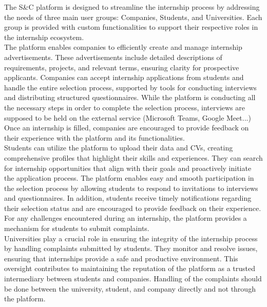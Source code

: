

The S\&C platform is designed to streamline the internship process by addressing the needs of three main user groups: Companies, Students, and Universities. Each group is provided with custom functionalities to support their respective roles in the internship ecosystem. \\

The platform enables companies to efficiently create and manage internship advertisements. These advertisements include detailed descriptions of requirements, projects, and relevant terms, ensuring clarity for prospective applicants. Companies can accept internship applications from students and handle the entire selection process, supported by tools for conducting interviews and distributing structured questionnaires. While the platform is conducting all the necessary steps in order to complete the selection process, interviews are supposed to be held on the external service (Microsoft Teams, Google Meet...) Once an internship is filled, companies are encouraged to provide feedback on their experience with the platform and its functionalities. \\

Students can utilize the platform to upload their data and CVs, creating comprehensive profiles that highlight their skills and experiences. They can search for internship opportunities that align with their goals and proactively initiate the application process. The platform enables easy and smooth participation in the selection process by allowing students to respond to invitations to interviews and questionnaires. In addition, students receive timely notifications regarding their selection status and are encouraged to provide feedback on their experience. For any challenges encountered during an internship, the platform provides a mechanism for students to submit complaints. \\

Universities play a crucial role in ensuring the integrity of the internship process by handling complaints submitted by students. They monitor and resolve issues, ensuring that internships provide a safe and productive environment. This oversight contributes to maintaining the reputation of the platform as a trusted intermediary between students and companies. Handling of the complaints should be done between the university, student, and company directly and not through the platform.

